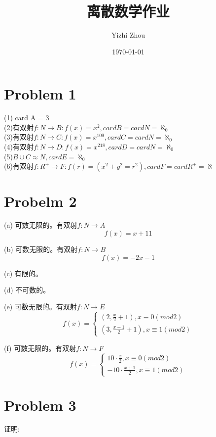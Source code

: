 \documentclass{article}
\title{离散数学作业}
\author{Yizhi Zhou}
\date{\today}
\begin{document}
\maketitle
\section*{Problem 1}

(1) card A = 3\\

(2)有双射$ f:N \rightarrow B : f(x) = x^{2}, card B = card N = \aleph_{0}$\\

(3)有双射$ f:N \rightarrow C : f(x) = x^{109}, card C = card N = \aleph_{0}$\\

(4)有双射$ f:N \rightarrow D : f(x) = x^{218}, card D = card N = \aleph_{0}$\\

(5)$B\cup C \approx N,cardE = \aleph_{0}$\\

(6)有双射$ f:R^{+} \rightarrow F : f(r) = (x^2+y^2=r^2) , card F = card R^{+} = \aleph$

\section*{Probelm 2}
(a) 可数无限的。有双射$f:N \rightarrow A$
$$ f(x)=x+11
$$

(b) 可数无限的。有双射$f:N \rightarrow B$
$$ f(x)=-2x-1
$$

(c) 有限的。

(d) 不可数的。

(e) 可数无限的。有双射$f:N \rightarrow E$
$$ f(x)=\left\{
    \begin{aligned}
    (2 , \frac{x}{2} + 1),x\equiv0(mod2) \\
    (3 , \frac{x-1}{2} + 1),x\equiv1(mod2)
    \end{aligned}
    \right.
$$

(f) 可数无限的。有双射$f:N \rightarrow F$
$$ f(x)=\left\{
    \begin{aligned}
    10 \cdot \frac{x}{2},x\equiv0(mod2) \\
    -10 \cdot \frac{x+1}{2},x\equiv1(mod2)
    \end{aligned}
    \right.
$$

\section*{Problem 3}
证明:
\end{document}
